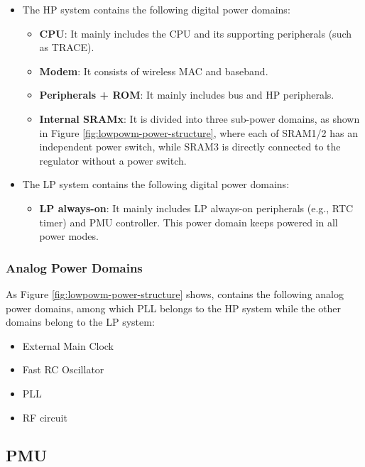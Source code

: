 \documentclass[main\_\_EN.tex]{subfiles}
\begin{document}
\begin{itemize}
    \item The HP system contains the following digital power domains:
    \begin{itemize}
        \item \textbf{CPU}: It mainly includes the CPU and its supporting peripherals (such as TRACE).
        \item \textbf{Modem}: It consists of wireless MAC and baseband.
        \item \textbf{Peripherals + ROM}: It mainly includes bus and HP peripherals.
        \item \textbf{Internal SRAMx}: It is divided into three sub-power domains, as shown in Figure \ref{fig:lowpowm-power-structure}, where each of SRAM1/2 has an independent power switch, while SRAM3 is directly connected to the regulator without a power switch.
    \end{itemize}
    \item The LP system contains the following digital power domains:
    \begin{itemize}
        \item \textbf{LP always-on}: It mainly includes LP always-on peripherals (e.g., RTC timer) and PMU controller. This power domain keeps powered in all power modes.
    \end{itemize}
\end{itemize}

\subsubsection{Analog Power Domains}

As Figure \ref{fig:lowpowm-power-structure} shows, \chipname{} contains the following analog power domains, among which PLL belongs to the HP system while the other domains belong to the LP system:

\begin{itemize}
    \item External Main Clock
    \item Fast RC Oscillator
    \item PLL
    \item RF circuit
\end{itemize}

\subsection{PMU}
\end{document}
